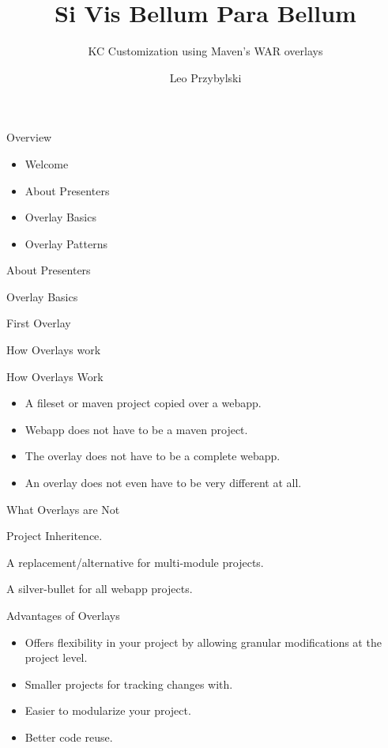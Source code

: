 \documentclass[xcolor=dvipsnames,14pt]{beamer}
\begin{document}
\title{Si Vis Bellum Para Bellum}
\subtitle{KC Customization using Maven's WAR overlays}
\author[Leo]{Leo Przybylski}


\begin{frame}[plain]
  \titlepage
\end{frame}

\begin{frame}{Overview}
  \begin{itemize}
  \item Welcome
  \item About Presenters
  \item Overlay Basics
  \item Overlay Patterns
  \end{itemize}
\end{frame}

\begin{frame}{About Presenters}
\end{frame}

\begin{frame}{Overlay Basics}
  \item First Overlay
  \item How Overlays work
\end{frame}

\begin{frame}{How Overlays Work}
  \begin{itemize}
    \item A fileset or maven project copied over a webapp.
    \item Webapp does not have to be a maven project.
    \item The overlay does not have to be a complete webapp.
    \item An overlay does not even have to be very different at all.
  \end{itemize}
\end{frame}

\begin{frame}{What Overlays are Not}
  \item Project Inheritence.
  \item A replacement/alternative for multi-module projects.
  \item A silver-bullet for all webapp projects.
\end{frame}


\begin{frame}{Advantages of Overlays}
  \begin{itemize}
    \item Offers flexibility in your project by allowing granular
      modifications at the project level.
    \item Smaller projects for tracking changes with.
    \item Easier to modularize your project.
    \item Better code reuse.
  \end{itemize}
\end{frame}
\end{document}
